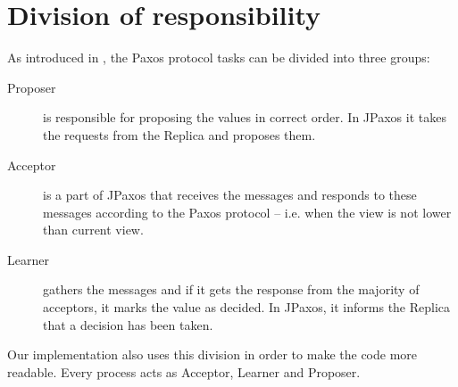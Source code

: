 
\section{Division of responsibility}

As introduced in \cite{Lam01}, the Paxos protocol tasks can be divided into three groups:
\begin{description}
 \item[Proposer] is responsible for proposing the values in correct order. In JPaxos it takes the requests from the Replica and proposes them.
 
 \item[Acceptor] is a part of JPaxos that receives the \propose messages and responds to these messages according to the Paxos protocol -- i.e. when the view is not lower than current view.
 
 \item[Learner] gathers the \accept messages and if it gets the response from the majority of acceptors, it marks the value as decided. In JPaxos, it informs the Replica that a decision has been taken.
\end{description}

Our implementation also uses this division in order to make the code more readable. Every process acts as Acceptor, Learner and Proposer.

